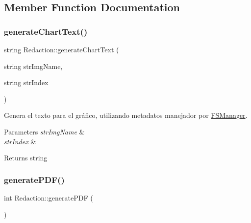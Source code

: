 \subsection{Member Function Documentation}
\mbox{\label{classRedaction_a466ce7f7f8b2a4ec810b2da9c7832f26}} 
\subsubsection{\texorpdfstring{generate\+Chart\+Text()}{generateChartText()}}
{\footnotesize\ttfamily string Redaction\+::generate\+Chart\+Text (\begin{DoxyParamCaption}\item[{string}]{str\+Img\+Name,  }\item[{string}]{str\+Index }\end{DoxyParamCaption})\hspace{0.3cm}{\ttfamily [inline]}}



Genera el texto para el gráfico, utilizando metadatos manejador por \mbox{\hyperlink{classFSManager}{F\+S\+Manager}}. 


\begin{DoxyParams}{Parameters}
{\em str\+Img\+Name} & \\
\hline
{\em str\+Index} & \\
\hline
\end{DoxyParams}
\begin{DoxyReturn}{Returns}
string 
\end{DoxyReturn}
\mbox{\label{classRedaction_a4659115b2df63c9e0694c7f7cf325ff6}} 
\subsubsection{\texorpdfstring{generate\+P\+D\+F()}{generatePDF()}}
{\footnotesize\ttfamily int Redaction\+::generate\+P\+DF (\begin{DoxyParamCaption}{ }\end{DoxyParamCaption})\hspace{0.3cm}{\ttfamily [inline]}}



